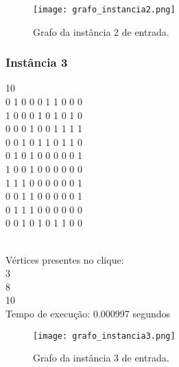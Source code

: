 \documentclass[12pt]{article}
\begin{document}
        \begin{figure}[H]
            \centering
            \texttt{[image: grafo\_instancia2.png]}
            \caption{Grafo da instância 2 de entrada.}
            \label{fig:instancia2}
        \end{figure}

    \subsubsection{Instância 3}
        \begin{tcolorbox}[title=Arquivo de entrada para a instância 3, width=\linewidth, 
          fontupper=\ttfamily, 
          halign=flush left]
            10 \\
            0 1 0 0 0 1 1 0 0 0 \\
            1 0 0 0 1 0 1 0 1 0 \\
            0 0 0 1 0 0 1 1 1 1 \\
            0 0 1 0 1 1 0 1 1 0 \\
            0 1 0 1 0 0 0 0 0 1 \\
            1 0 0 1 0 0 0 0 0 0 \\
            1 1 1 0 0 0 0 0 0 1 \\
            0 0 1 1 0 0 0 0 0 1 \\
            0 1 1 1 0 0 0 0 0 0 \\
            0 0 1 0 1 0 1 1 0 0 \\
        \end{tcolorbox}

        \begin{tcolorbox}[title=Saída da instância 3, width=\linewidth, 
          fontupper=\ttfamily, 
          halign=flush left]
            [0, 0, 1, 0, 0, 0, 0, 1, 0, 1] \\
            Vértices presentes no clique: \\
            3 \\
            8 \\
            10 \\
            Tempo de execução: 0.000997 segundos \\
        \end{tcolorbox}

        \begin{figure}[H]
            \centering
            \texttt{[image: grafo\_instancia3.png]}
            \caption{Grafo da instância 3 de entrada.}
            \label{fig:instancia3}
        \end{figure}
     
\end{document}
